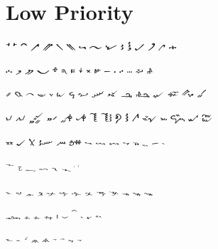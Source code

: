 \documentclass[12pt]{article}
\begin{document}
\section*{Low Priority}
{\Neume

𝀀 𝀁 𝀂 𝀃 𝀄 𝀅 𝀆 𝀇 𝀈 𝀉 𝀊 𝀋 𝀌 𝀍 𝀎 𝀏

𝀐 𝀑 𝀒 𝀓 𝀔 𝀕 𝀖 𝀗 𝀘 𝀙 𝀚 𝀛 𝀜 𝀝 𝀞 𝀟

𝀠 𝀡 𝀢 𝀣 𝀤 𝀥 𝀦 𝀧 𝀨 𝀩 𝀪 𝀫 𝀬 𝀭 𝀮 𝀯

𝀰 𝀱 𝀲 𝀳 𝀴 𝀵 𝀶 𝀷 𝀸 𝀹 𝀺 𝀻 𝀼 𝀽 𝀾 𝀿

𝁀 𝁁 𝁂 𝁃 𝁄 𝁅 𝁊 𝁋 𝁌 𝁍 𝁒 𝂤 𝁈 𝁗

𝁞
\hspace{0.5em}
𝁟
\hspace{0.5em}
𝁡
\hspace{0.5em}
𝁢
\hspace{0.5em}
𝁤
\hspace{0.5em}
𝁥
\hspace{0.5em}
𝃚
\hspace{0.5em}
𝃛

𝁨
\hspace{0.5em}
𝁩
\hspace{1em}
𝁪
\hspace{0.5em}
𝁫
\hspace{0.5em}
𝁬
\hspace{0.5em}
𝁭
\hspace{0.5em}
𝁮
\hspace{0.5em}
𝁯
\hspace{0.5em}
𝁰
\hspace{0.5em}
𝁱
\hspace{0.5em}
𝁲
\hspace{0.5em}
𝁳
\hspace{0.5em}
𝁴

𝁵
\hspace{1em}
𝁶
\hspace{0.5em}
𝁸
\hspace{0.5em}
𝁹
\hspace{0.5em}
𝁺
\hspace{0.5em}
𝁼
\hspace{0.5em}
𝁽
\hspace{0.5em}
𝂀
\hspace{0.5em}
𝂁
\hspace{0.5em}
𝂢

𝂂
\hspace{0.5em}
𝂃
\hspace{0.5em}
𝂮
\hspace{0.5em}
𝂷
\hspace{0.5em}
𝂸
\hspace{0.5em}
𝂯
\hspace{0.5em}
𝂰
\hspace{0.5em}
𝁔
\hspace{0.5em}
𝂄
}
\end{document}
